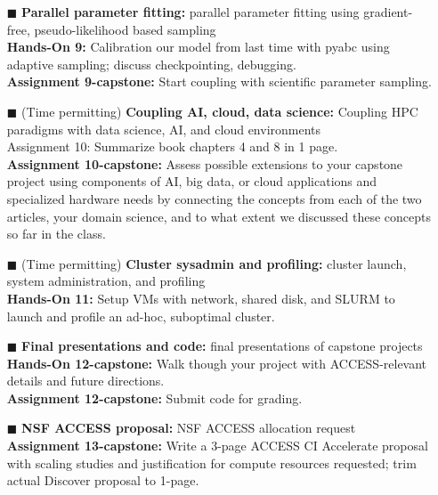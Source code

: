\documentclass{article}
\begin{document}
\begin{tcbposter}
{\begin{multicols}{2}
\begin{itemize}
        implemented\supercite{cilfone_2015}.%
      \item[\textcolor{green!50!black}{$\blacksquare$}] \textbf{
          Parallel parameter fitting:} parallel parameter fitting
        using gradient-free, pseudo-likelihood based sampling\\
        \textbf{Hands-On 9:} Calibration our model from last time with
        pyabc using adaptive sampling; discuss
        checkpointing, debugging.\\
        \textbf{Assignment 9-capstone:} Start coupling with scientific
        parameter sampling.%
      \item[\textcolor{green!50!black}{$\blacksquare$}] (Time
        permitting) \textbf{Coupling AI, cloud, data science:}
        Coupling HPC
        paradigms with data science, AI, and cloud environments\\
        Assignment 10: Summarize book\supercite{zbakh_2024} chapters 4
        and 8 in 1 page.\\
        \textbf{Assignment 10-capstone:} Assess possible extensions to
        your capstone project using components of AI, big data, or
        cloud applications and specialized hardware needs by
        connecting the concepts from each of the two articles, your
        domain science, and to what extent we discussed these concepts
        so far in the class.%
      \item[\textcolor{black!60}{$\blacksquare$}] (Time permitting)
        \textbf{Cluster sysadmin and profiling:} cluster launch,
        system
        administration, and profiling\\
        \textbf{Hands-On 11:} Setup VMs with network, shared disk, and
        SLURM to launch and profile an ad-hoc, suboptimal cluster.%
      \item[\textcolor{red!80!black}{$\blacksquare$}] \textbf{Final
          presentations and code:} final presentations of capstone
        projects\\
        \textbf{Hands-On 12-capstone:} Walk though your project with
        ACCESS-relevant details and future directions.\\
        \textbf{Assignment 12-capstone:} Submit code for grading.%
      \item[\textcolor{red!80!black}{$\blacksquare$}] \textbf{NSF
          ACCESS proposal:} NSF ACCESS allocation request\\
        \textbf{Assignment 13-capstone:} Write a 3-page ACCESS CI
        Accelerate proposal with scaling studies and justification for
        compute resources requested; trim actual Discover proposal to
        1-page.%
      \end{itemize}
    \end{multicols}
  }


\end{tcbposter}
\end{document}
